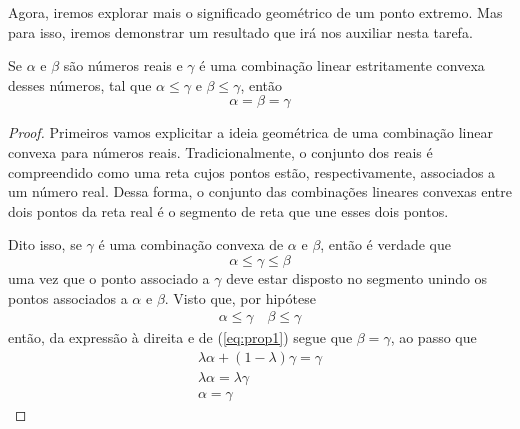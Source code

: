 
Agora, iremos explorar mais o significado geométrico de um ponto extremo.
Mas para isso, iremos demonstrar um resultado que irá nos auxiliar nesta tarefa.

\begin{prop:combinação convexa}
	\label{prop:combinação convexa}
	Se $\alpha$ e $\beta$ são números reais e $\gamma$ é uma combinação linear
	estritamente convexa desses números, tal que $\alpha \leq \gamma$ e
	$\beta \leq \gamma$, então \[\alpha = \beta = \gamma\]

	\begin{proof}
		Primeiros vamos explicitar a ideia geométrica de uma combinação linear
		convexa para números reais. Tradicionalmente, o conjunto dos reais é
		compreendido como uma reta cujos pontos estão, respectivamente, associados
		a um número real. Dessa forma, o conjunto das combinações lineares convexas
		entre dois pontos da reta real é o segmento de reta que une esses dois pontos.

		Dito isso, se $\gamma$ é uma combinação convexa de $\alpha$ e $\beta$, então é verdade que
		\begin{equation}
			\label{eq:prop1}
			\alpha \leq \gamma \leq \beta
		\end{equation}uma vez que o ponto associado a $\gamma$ deve estar
		disposto no segmento unindo os pontos associados a $\alpha$ e $\beta$.
		Visto que, por hipótese
		\begin{align*}
			\alpha \leq \gamma \quad \beta \leq \gamma
		\end{align*}
		então, da expressão à direita e de (\ref{eq:prop1})
		segue que $\beta = \gamma$, ao passo que
		\begin{gather*}
			\lambda \alpha + (1 - \lambda) \gamma = \gamma \\
			\lambda \alpha = \lambda \gamma \\
			\alpha = \gamma
		\end{gather*}
	\end{proof}
\end{prop:combinação convexa}

